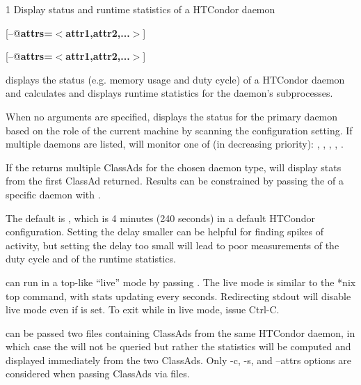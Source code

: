 \begin{ManPage}{\label{man-condor-top}}{1}
{Display status and runtime statistics of a HTCondor daemon}


\Synopsis {}

[\verb@--@\textbf{attrs=$<$attr1,attr2,...$>$}]

[\verb@--@\textbf{attrs=$<$attr1,attr2,...$>$}]

\Description
{} displays the status 
(e.g. memory usage and duty cycle) 
of a HTCondor daemon
and calculates and displays runtime statistics 
for the daemon's subprocesses.

When no arguments are specified,
 displays the status 
for the primary daemon
based on the role of the current machine
by scanning the 
configuration setting.
If multiple daemons are listed,
 will monitor one of (in decreasing priority): 
, 
, 
, 
, 
.

If the  returns multiple ClassAds 
for the chosen daemon type,
 will display stats from the first ClassAd returned.
Results can be constrained
by passing the  of a specific daemon with .

The default  is ,
which is 4 minutes (240 seconds)
in a default HTCondor configuration.
Setting the delay smaller 
can be helpful 
for finding spikes of activity,
but setting the delay too small
will lead to poor measurements
of the duty cycle
and of the runtime statistics.

 can run in a top-like ``live'' mode
by passing .
The live mode is similar to the *nix top command,
with stats updating every  seconds.
Redirecting stdout will disable live mode
even if  is set.
To exit  while in live mode,
issue Ctrl-C.

 can be passed two files containing ClassAds
from the same HTCondor daemon,
in which case the  will not be queried
but rather the statistics will be computed and displayed immediately
from the two ClassAds.
Only -c, -s, and --attrs options are considered 
when passing ClassAds via files.


\end{ManPage}
